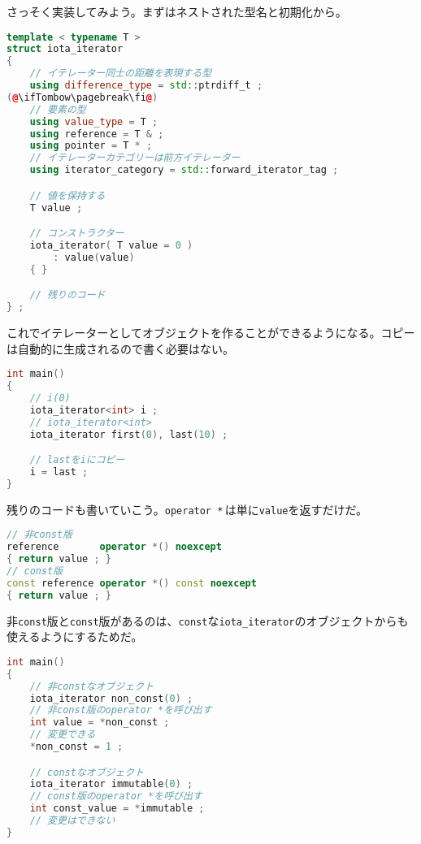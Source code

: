さっそく実装してみよう。まずはネストされた型名と初期化から。

\begin{lstlisting}[language={C++}]
template < typename T >
struct iota_iterator
{
    // イテレーター同士の距離を表現する型
    using difference_type = std::ptrdiff_t ;
(@\ifTombow\pagebreak\fi@)
    // 要素の型
    using value_type = T ;
    using reference = T & ;
    using pointer = T * ;
    // イテレーターカテゴリーは前方イテレーター
    using iterator_category = std::forward_iterator_tag ;

    // 値を保持する
    T value ;

    // コンストラクター
    iota_iterator( T value = 0 )
        : value(value)
    { }

    // 残りのコード
} ;
\end{lstlisting}

これでイテレーターとしてオブジェクトを作ることができるようになる。コピーは自動的に生成されるので書く必要はない。

\begin{lstlisting}[language={C++}]
int main()
{
    // i(0)
    iota_iterator<int> i ;
    // iota_iterator<int>
    iota_iterator first(0), last(10) ;

    // lastをiにコピー
    i = last ;
}
\end{lstlisting}

残りのコードも書いていこう。\texttt{operator *}\,は単に\texttt{value}を返すだけだ。

\begin{lstlisting}[language={C++}]
// 非const版
reference       operator *() noexcept
{ return value ; }
// const版
const reference operator *() const noexcept
{ return value ; }
\end{lstlisting}

非\texttt{const}版と\texttt{const}版があるのは、\texttt{const}な\texttt{iota\_iterator}のオブジェクトからも使えるようにするためだ。

\ifTombow\pagebreak\fi
\begin{lstlisting}[language={C++}]
int main()
{
    // 非constなオブジェクト
    iota_iterator non_const(0) ;
    // 非const版のoperator *を呼び出す
    int value = *non_const ;
    // 変更できる
    *non_const = 1 ;

    // constなオブジェクト
    iota_iterator immutable(0) ;
    // const版のoperator *を呼び出す
    int const_value = *immutable ;
    // 変更はできない
}
\end{lstlisting}

